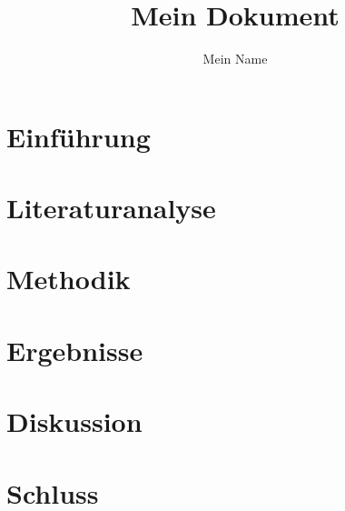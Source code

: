 \documentclass[twocolumn,a4paper]{article}
\title{Mein Dokument}
\author{Mein Name}
\begin{document}
\maketitle

\tableofcontents


\section{Einführung}
\lipsum[1-3]

\section{Literaturanalyse}
\lipsum[4-6]

\section{Methodik}
\lipsum[7-9]

\section{Ergebnisse}
\lipsum[1-3]

\section{Diskussion}
\lipsum[4-6]

\section{Schluss}
\lipsum[7-8]
\end{document}
